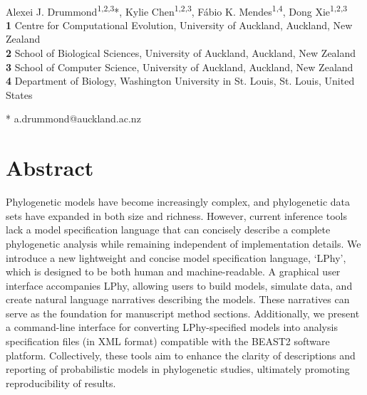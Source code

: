 \documentclass[10pt,letterpaper,table]{article}
\theoremstyle{definition}
\begin{document}
\vspace*{0.2in}

\begin{flushleft}
{\Large
\textbf{} 
}
\newline
\\
Alexei J. Drummond\textsuperscript{1,2,3}*,
Kylie Chen\textsuperscript{1,2,3},
F\'{a}bio K. Mendes\textsuperscript{1,4},
Dong Xie\textsuperscript{1,2,3}
\\
\bigskip
\textbf{1} Centre for Computational Evolution, University of Auckland, Auckland, New Zealand
\\
\textbf{2} School of Biological Sciences, University of Auckland, Auckland, New Zealand
\\
\textbf{3} School of Computer Science, University of Auckland, Auckland, New Zealand
\\
\textbf{4} Department of Biology, Washington University in St. Louis, St. Louis, United States
\\
\bigskip

% 
%

* a.drummond@auckland.ac.nz

\end{flushleft}

\section*{Abstract}
Phylogenetic models have become increasingly complex, and phylogenetic data sets have expanded in both size and richness. 
However, current inference tools lack a model specification language that can concisely describe a complete phylogenetic analysis while remaining independent of implementation details. 
We introduce a new lightweight and concise model specification language, `LPhy', which is designed to be both human and machine-readable. 
A graphical user interface accompanies LPhy, allowing users to build models, simulate data, and create natural language narratives describing the models. 
These narratives can serve as the foundation for manuscript method sections. 
Additionally, we present a command-line interface for converting LPhy-specified models into analysis specification files (in XML format) compatible with the BEAST2 software platform. 
Collectively, these tools aim to enhance the clarity of descriptions and reporting of probabilistic models in phylogenetic studies, ultimately promoting reproducibility of results.
\end{document}
